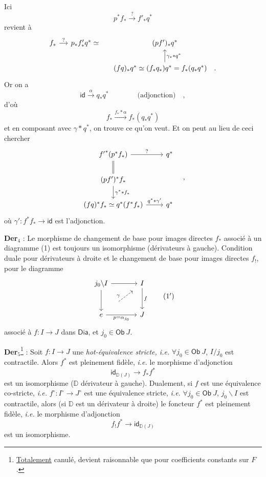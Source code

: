 \documentclass[11pt]{article}
\newcommand{\printedpage}[1]{\marginpar{\footnotesize p.~#1}}
\newcommand{\msp}[1]{\marginpar{\footnotesize [#1]}}
\newcommand{\DD}{\mathbb{D}}
\newcommand{\sDia}{\mathsf{Dia}}
\newcommand{\sOb}{\mathsf{Ob}}
\newcommand{\sid}{\mathsf{id}}
\begin{document}
Ici
\[ p^* f_* \xrightarrow{?} f'_* q^* \]
revient à
\[
\begin{tikzcd}[column sep=small]
f_* \arrow[r, "?"] & p_* f'_* q^* \simeq & (pf')_* q^* \\
 & & (fq)_* q^* \simeq (f_* q_*) q^* = f_*(q_* q^*) \quad . \arrow[u, "\gamma_* * q^*"']
\end{tikzcd}
\]
Or on a
\[ \sid \xrightarrow{\alpha} q_* q^* \qquad\qquad \text{(adjonction)} \quad , \]
d'où
\[ f_* \xrightarrow{f_* * \alpha} f_*(q_* q^*) \]
et en composant avec $\gamma * q^*$, on trouve ce qu'on veut. Et on peut au lieu de ceci chercher
\[
\begin{tikzcd}
{f'}^*(p^* f_*) \arrow[r, "?"] \arrow[d, equal] & q^* \\
(pf')^* f_* \arrow[d, "\gamma^* * f_*"] & \\
(fq)^* f_* \simeq q^*(f^* f_*) \arrow[r, "q^* * \gamma'"] & q^*
\end{tikzcd}
\quad ,
\]
où $\gamma' : f^* f_* \to \sid$ est l'adjonction.

\printedpage{22}
\msp{page 32}
\textbf{Der}$_4$ : Le morphisme de changement de base pour images directes $f_*$ associé à un diagramme (1) est toujours un isomorphisme (dérivateurs à gauche). Condition duale pour dérivateurs à droite et le changement de base pour images directes $f_!$, pour le diagramme
\[
\begin{tikzcd}[row sep=large, column sep=large]
j_0 \backslash I \arrow[r] \arrow[d] & I \arrow[d, "f"] \\
e \arrow[r, "p = \alpha_{j_0}"'] & J
\arrow[from=2-1, to=1-2, dashed, shorten <=22pt, shorten >=8pt, "\gamma"]
\end{tikzcd}
\tag*{(1$'$)}
\]
associé à $f : I \to J$ dans $\sDia$, et $j_0 \in \sOb\ J$.

\textbf{Der}$_5$\footnote[10]{\underline{Totalement} canulé, devient raisonnable que pour coefficients constants sur $F$.} : Soit $f : I \to J$ une \textit{hot-équivalence stricte, i.e.} $\forall j_0 \in \sOb\ J$, $I/j_0$ est contractile. Alors $f^*$ est pleinement fidèle, \textit{i.e.} le morphisme d'adjonction
\[ \sid_{\DD(J)} \longrightarrow f_* f^* \]
est un isomorphisme ($\DD$ dérivateur à gauche). Dualement, si $f$ est une équivalence co-stricte, \textit{i.e.} $f^\circ : I^\circ \to J^\circ$ est une équivalence stricte, \textit{i.e.} $\forall j_0 \in \sOb\ J$, $j_0 \backslash I$ est contractile, alors (si $\DD$ est un dérivateur à droite) le foncteur $f^*$ est pleinement fidèle, \textit{i.e.} le morphisme d'adjonction %
\[ f_! f^* \longrightarrow \sid_{\DD(J)} \]
est un isomorphisme.
\end{document}
